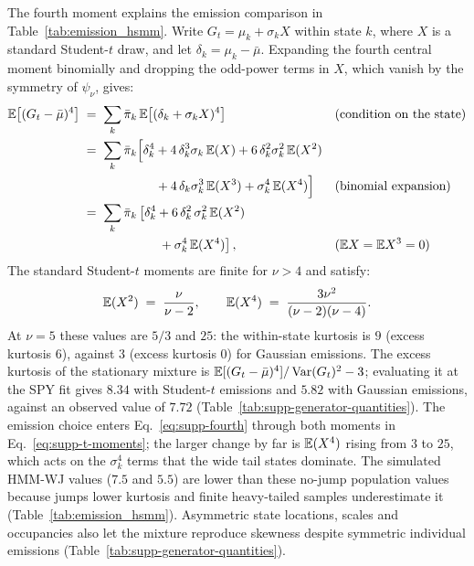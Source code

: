 The fourth moment explains the emission comparison in
Table~\ref{tab:emission_hsmm}. Write $G_t = \mu_k +
\sigma_k X$ within state $k$, where $X$ is a standard Student-$t$
draw, and let $\delta_k = \mu_k - \bar\mu$. Expanding the fourth
central moment binomially and dropping the odd-power terms in $X$,
which vanish by the symmetry of $\psi_\nu$, gives:
\begin{align}
  \mathbb{E}\big[(G_t - \bar\mu)^4\big]
   &\;=\; \sum_k \bar\pi_k\,
     \mathbb{E}\big[(\delta_k + \sigma_k X)^4\big]
     && \text{(condition on the state)} \notag \\
   &\;=\; \sum_k \bar\pi_k \Big[
     \delta_k^4 + 4\, \delta_k^3 \sigma_k\, \mathbb{E}(X)
     + 6\, \delta_k^2 \sigma_k^2\, \mathbb{E}(X^2) \notag \\
   &\hspace{6em}
     + 4\, \delta_k \sigma_k^3\, \mathbb{E}(X^3) + \sigma_k^4\, \mathbb{E}(X^4)\Big]
     && \text{(binomial expansion)} \notag \\
   &\;=\; \sum_k \bar\pi_k \left[
     \delta_k^4
     + 6\, \delta_k^2\, \sigma_k^2\, \mathbb{E}(X^2)\right. \notag \\
   &\hspace{6em}\left.{}
     + \sigma_k^4\, \mathbb{E}(X^4)
     \right],
     && \text{($\mathbb{E} X = \mathbb{E} X^3 = 0$)}
  \label{eq:supp-fourth}
\end{align}
The standard Student-$t$ moments are finite for $\nu > 4$ and satisfy:
\begin{equation}
  \mathbb{E}(X^2) \;=\; \frac{\nu}{\nu - 2},
  \qquad
  \mathbb{E}(X^4) \;=\; \frac{3 \nu^2}{(\nu - 2)(\nu - 4)}.
  \label{eq:supp-t-moments}
\end{equation}
At $\nu = 5$ these values are $5/3$ and $25$: the within-state
kurtosis is $9$ (excess kurtosis $6$), against $3$ (excess kurtosis
$0$) for Gaussian emissions. The excess kurtosis of the stationary mixture is
$\mathbb{E}[(G_t - \bar\mu)^4] / \operatorname{Var}(G_t)^2 - 3$; evaluating it at the SPY
fit gives $8.34$ with Student-$t$ emissions and $5.82$ with Gaussian
emissions, against an observed value of $7.72$
(Table~\ref{tab:supp-generator-quantities}). The emission choice enters
Eq.~\eqref{eq:supp-fourth} through both moments in
Eq.~\eqref{eq:supp-t-moments}; the larger change by far is
$\mathbb{E}(X^4)$ rising from $3$ to $25$, which acts on the $\sigma_k^4$
terms that the wide tail states dominate. The simulated HMM-WJ values ($7.5$ and $5.5$) are lower than these no-jump population values because jumps lower kurtosis and finite heavy-tailed samples underestimate it (Table~\ref{tab:emission_hsmm}). Asymmetric state locations, scales and occupancies also let the mixture reproduce skewness despite symmetric individual emissions (Table~\ref{tab:supp-generator-quantities}).


